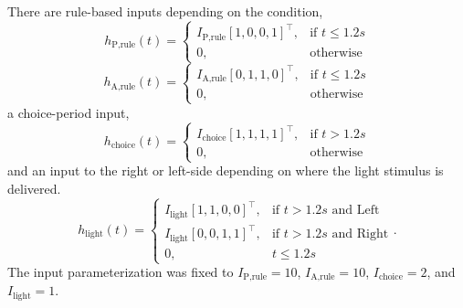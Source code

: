 \documentclass[11pt]{article}
\begin{document}
There are rule-based inputs depending on the condition,
\begin{equation}h_{\text{P,rule}}(t) = \begin{cases}
                           I_{\text{P,rule}} [1, 0, 0, 1]^\top,& \text{if } t\leq 1.2s \\
                            0,              & \text{otherwise}
                         \end{cases}
\end{equation}
\begin{equation} h_{\text{A,rule}}(t) = \begin{cases}
                           I_{\text{A,rule}} [0, 1, 1, 0]^\top,& \text{if } t\leq 1.2s \\
                            0,              & \text{otherwise}
                         \end{cases}
\end{equation}
a choice-period input,
\begin{equation} h_{\text{choice}}(t) = \begin{cases}
                           I_{\text{choice}} [1, 1, 1, 1]^\top,& \text{if } t > 1.2s \\
                            0,              & \text{otherwise}
                         \end{cases}
\end{equation}
and an input to the right or left-side depending on where the light stimulus is delivered.     
\begin{equation}  h_{\text{light}}(t) = \begin{cases}
                           I_{\text{light}} [1, 1, 0, 0]^\top,& \text{if } t > 1.2s \text{ and Left} \\
                           I_{\text{light}} [0, 0, 1, 1]^\top,& \text{if } t > 1.2s \text{ and Right} \\
                            0,              & t \leq 1.2s
                         \end{cases} .
\end{equation}
The input parameterization was fixed to $I_{\text{P,rule}} = 10 $,  $I_{\text{A,rule}} = 10$,  $I_{\text{choice}} = 2$,  and $I_{\text{light}} = 1$.
\end{document}
